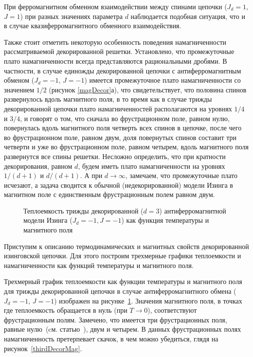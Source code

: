 При ферромагнитном обменном взаимодействии между спинами цепочки ($J_d=1$, $J=1$) при разных значениях параметра $d$ наблюдается подобная ситуация, что и в случае квазиферромагнитного обменного взаимодействия.

Также стоит отметить некоторую особенность поведения намагниченности рассматриваемой декорированной решетки. Установлено, что промежуточные плато намагниченности всегда представляются рациональными дробями. В частности, в случае единожды декорированной цепочки с антиферромагнитным обменом ($J_d=-1$, $J=-1$) имеется промежуточное плато намагниченности со значением $1/2$ (рисунок \ref{magDecor}а), что свидетельствует, что половина спинов развернулось вдоль магнитного поля, в то время как в случае трижды декорированной цепочки плато намагниченностей располагаются на уровнях $1/4$ и $3/4$, и говорят о том, что сначала во фрустрационном поле, равном нулю, повернулась вдоль магнитного поля четверть всех спинов в цепочке, после чего во фрустрационном поле, равном двум, доля повернутых спинов составит три четверти и уже во фрустрационном поле, равном четырем, вдоль магнитного поля развернутся все спины решетки. Несложно определить, что при кратности декорирования, равном $d$, будем иметь плато намагниченности на уровнях $1/(d+1)$ и $d/(d+1)$. А при $d \rightarrow \infty$, замечаем, что промежуточные плато исчезают, а задача сводится к обычной (недекорированной) модели Изинга в магнитном поле с единственным фрустрационным полем равном двум.

 \begin{figure}[h]
 	\caption{Теплоемкость трижды декорированной ($d=3$) антиферромагнитной модели Изинга ($J_d=-1, J=-1$) как функция температуры и магнитного поля}
 	\label{thirdDecorHeat}
 \end{figure}

Приступим к описанию термодинамических и магнитных свойств декорированной изинговской цепочки. Для этого построим трехмерные графики теплоемкости и намагниченности как функций температуры и магнитного поля.

Трехмерный график теплоемкости как функции температуры и магнитного поля для трижды декорированной цепочки в случае антиферромагнитного обмена ($J_d=-1$, $J=-1$) изображен на рисунке~\ref{thirdDecorHeat}. Значения магнитного поля, в точках где теплоемкость обращается в нуль (при $T\rightarrow 0$), соответствуют фрустрационным полям. Замечено, что имеется три фрустрационных поля, равные нулю~(cм. статью~\cite{vakbib2}), двум и четырем. В данных фрустрационных полях намагниченность претерпевает скачок, в чем можно убедиться, глядя на рисунок~\ref{thirdDecorMag}.

